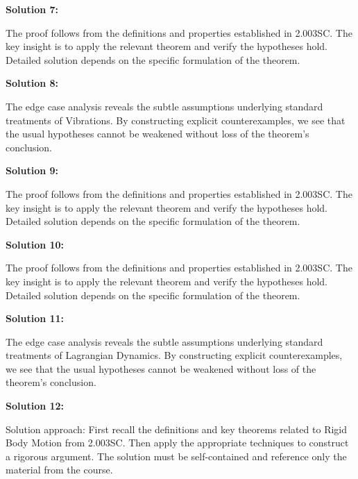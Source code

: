 \documentclass[12pt,a4paper]{exam}
\begin{document}
\vspace{0.5cm}

\textbf{Solution 7:}

The proof follows from the definitions and properties established in 2.003SC. The key insight is to apply the relevant theorem and verify the hypotheses hold. Detailed solution depends on the specific formulation of the theorem.

\vspace{0.5cm}

\textbf{Solution 8:}

The edge case analysis reveals the subtle assumptions underlying standard treatments of Vibrations. By constructing explicit counterexamples, we see that the usual hypotheses cannot be weakened without loss of the theorem's conclusion.

\vspace{0.5cm}

\textbf{Solution 9:}

The proof follows from the definitions and properties established in 2.003SC. The key insight is to apply the relevant theorem and verify the hypotheses hold. Detailed solution depends on the specific formulation of the theorem.

\vspace{0.5cm}

\textbf{Solution 10:}

The proof follows from the definitions and properties established in 2.003SC. The key insight is to apply the relevant theorem and verify the hypotheses hold. Detailed solution depends on the specific formulation of the theorem.

\vspace{0.5cm}

\textbf{Solution 11:}

The edge case analysis reveals the subtle assumptions underlying standard treatments of Lagrangian Dynamics. By constructing explicit counterexamples, we see that the usual hypotheses cannot be weakened without loss of the theorem's conclusion.

\vspace{0.5cm}

\textbf{Solution 12:}

Solution approach: First recall the definitions and key theorems related to Rigid Body Motion from 2.003SC. Then apply the appropriate techniques to construct a rigorous argument. The solution must be self-contained and reference only the material from the course.
\end{document}
